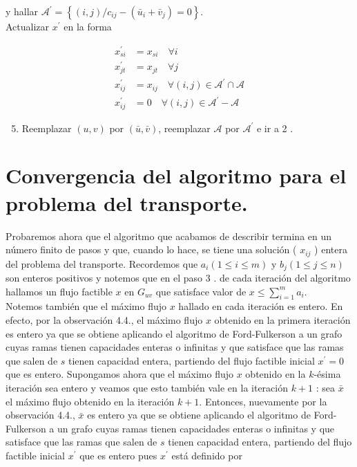 \documentclass[10pt]{article}
\begin{document}
y hallar $\mathcal{A}^{\prime}=\left\{(i, j) / c_{i j}-\left(\bar{u}_{i}+\bar{v}_{j}\right)=0\right\}$.\\
Actualizar $x^{\prime}$ en la forma

$$
\begin{aligned}
x_{s i}^{\prime} & =x_{s i} \quad \forall i \\
x_{j t}^{\prime} & =x_{j t} \quad \forall j \\
x_{i j}^{\prime} & =x_{i j} \quad \forall(i, j) \in \mathcal{A}^{\prime} \cap \mathcal{A} \\
x_{i j}^{\prime} & =0 \quad \forall(i, j) \in \mathcal{A}^{\prime}-\mathcal{A}
\end{aligned}
$$

\begin{enumerate}
  \setcounter{enumi}{4}
  \item Reemplazar $(u, v)$ por $(\bar{u}, \bar{v})$, reemplazar $\mathcal{A}$ por $\mathcal{A}^{\prime}$ e ir a 2 .
\end{enumerate}

\section*{Convergencia del algoritmo para el problema del transporte.}
Probaremos ahora que el algoritmo que acabamos de describir termina en un número finito de pasos y que, cuando lo hace, se tiene una solución ( $x_{i j}$ ) entera del problema del transporte. Recordemos que $a_{i} (1 \leq i \leq m)$ y $b_{j}(1 \leq j \leq n)$ son enteros positivos y notemos que en el paso 3 . de cada iteración del algoritmo hallamos un flujo factible $x$ en $G_{u v}$ que satisface valor de $x \leq \sum_{i=1}^{m} a_{i}$.\\
Notemos también que el máximo flujo $x$ hallado en cada iteración es entero. En efecto, por la observación 4.4., el máximo flujo $x$ obtenido en la primera iteración es entero ya que se obtiene aplicando el algoritmo de Ford-Fulkerson a un grafo cuyas ramas tienen capacidades enteras o infinitas y que satisface que las ramas\\
que salen de $s$ tienen capacidad entera, partiendo del flujo factible inicial $x^{\prime}=0$ que es entero. Supongamos ahora que el máximo flujo $x$ obtenido en la $k$-ésima iteración sea entero y veamos que esto también vale en la iteración $k+1$ : sea $\bar{x}$ el máximo flujo obtenido en la iteración $k+1$. Entonces, nuevamente por la observación 4.4., $\bar{x}$ es entero ya que se obtiene aplicando el algoritmo de Ford-Fulkerson a un grafo cuyas ramas tienen capacidades enteras o infinitas y que satisface que las ramas que salen de $s$ tienen capacidad entera, partiendo del flujo factible inicial $x^{\prime}$ que es entero pues $x^{\prime}$ está definido por
\end{document}
